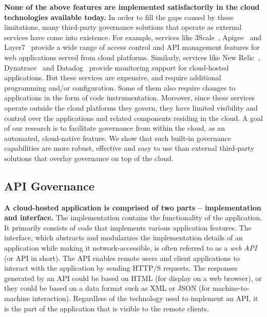 \textbf{None of the above features are implemented satisfactorily in the cloud technologies available today.}
In order to fill the gaps caused by these limitations, many third-party governance solutions that operate as external services
have come into existence. For example, services like 3Scale~\cite{3scale}, Apigee~\cite{apigee} and Layer7~\cite{layer7} provide a wide range
of access control and API management features for web applications served from cloud platforms. Similarly, 
services like New Relic~\cite{newrelic}, Dynatrace~\cite{dynatrace} and Datadog~\cite{datadog} provide monitoring support for cloud-hosted 
applications. But these services are expensive, and require additional programming and/or configuration.
Some of them also require changes to applications in the form of code instrumentation. Moreover,
since these services operate outside the cloud platforms they govern, they have limited visibility and control
over the applications and related components residing in the cloud. A goal of our research is to facilitate governance
from within the cloud, as an automated, cloud-native feature. We show that such built-in governance capabilities are
more robust, effective and easy to use than external third-party solutions that overlay governance on top of the
cloud.

\subsection{API Governance}
\textbf{A cloud-hosted application is comprised of two parts -- implementation and interface.} The implementation
contains the functionality of the application. It primarily consists of code that implements
various application features. 
The interface, which abstracts and modularizes the implementation details of an application while making
it network-accessible, is often referred to as a \textit{web API} (or API in short).
The API enables remote users and client applications to interact with the application by sending
HTTP/S requests. The responses generated by an API could be based on HTML (for display on a web
browser), or they could be based on a data format such as XML or JSON (for machine-to-machine 
interaction). Regardless of the technology used to implement an API, it is the part of the application 
that is visible to the remote clients. 

